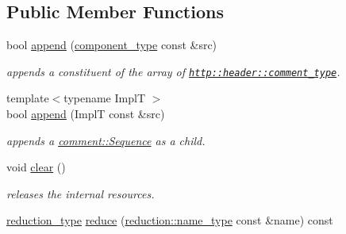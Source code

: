 \subsection*{Public Member Functions}
\begin{DoxyCompactItemize}
\item 
\hypertarget{classhryky_1_1http_1_1header_1_1comment_1_1_sequence_a2b5373fe1ba224816e6c580acddaaf46}{bool \hyperlink{classhryky_1_1http_1_1header_1_1comment_1_1_sequence_a2b5373fe1ba224816e6c580acddaaf46}{append} (\hyperlink{classhryky_1_1_shared_ptr}{component\-\_\-type} const \&src)}\label{classhryky_1_1http_1_1header_1_1comment_1_1_sequence_a2b5373fe1ba224816e6c580acddaaf46}

\begin{DoxyCompactList}\small\item\em appends a constituent of the array of \href{http::header::comment_type}{\tt http\-::header\-::comment\-\_\-type}. \end{DoxyCompactList}\item 
\hypertarget{classhryky_1_1http_1_1header_1_1comment_1_1_sequence_a298f65d5f617fffc9edc2942a3044a88}{{\footnotesize template$<$typename Impl\-T $>$ }\\bool \hyperlink{classhryky_1_1http_1_1header_1_1comment_1_1_sequence_a298f65d5f617fffc9edc2942a3044a88}{append} (Impl\-T const \&src)}\label{classhryky_1_1http_1_1header_1_1comment_1_1_sequence_a298f65d5f617fffc9edc2942a3044a88}

\begin{DoxyCompactList}\small\item\em appends a \hyperlink{classhryky_1_1http_1_1header_1_1comment_1_1_sequence}{comment\-::\-Sequence} as a child. \end{DoxyCompactList}\item 
\hypertarget{classhryky_1_1http_1_1header_1_1comment_1_1_sequence_a4a4fd4cf831b843be56cec2c2656b6ae}{void \hyperlink{classhryky_1_1http_1_1header_1_1comment_1_1_sequence_a4a4fd4cf831b843be56cec2c2656b6ae}{clear} ()}\label{classhryky_1_1http_1_1header_1_1comment_1_1_sequence_a4a4fd4cf831b843be56cec2c2656b6ae}

\begin{DoxyCompactList}\small\item\em releases the internal resources. \end{DoxyCompactList}\item 
\hypertarget{classhryky_1_1http_1_1header_1_1comment_1_1_sequence_a1717fd92386be6b5d2adbf78f36ff673}{\hyperlink{namespacehryky_a343a9a4c36a586be5c2693156200eadc}{reduction\-\_\-type} \hyperlink{classhryky_1_1http_1_1header_1_1comment_1_1_sequence_a1717fd92386be6b5d2adbf78f36ff673}{reduce} (\hyperlink{namespacehryky_1_1reduction_ac686c30a4c8d196bbd0f05629a6b921f}{reduction\-::name\-\_\-type} const \&name) const }\label{classhryky_1_1http_1_1header_1_1comment_1_1_sequence_a1717fd92386be6b5d2adbf78f36ff673}


\end{DoxyCompactItemize}
